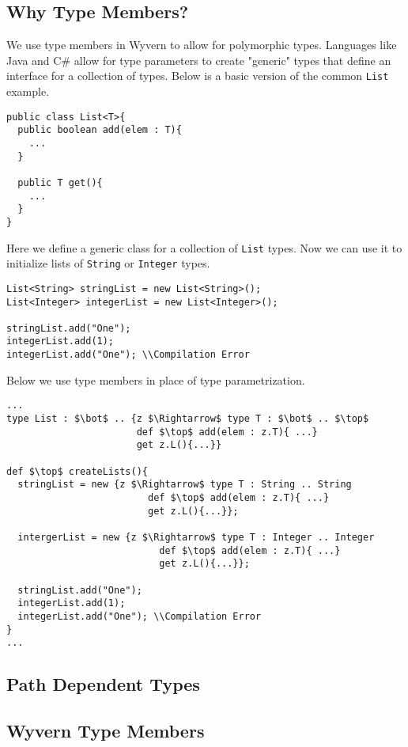 \documentclass{llncs}
\numberwithin{subcase}{casethm}
\numberwithin{casethm}{theorem}
\numberwithin{casethm}{lemma}
\begin{document}
\subsection{Why Type Members?}
We use type members in Wyvern to allow for polymorphic types. 
Languages like Java and C\# allow for type parameters to create 
"generic" types that define an interface for a collection of types. 
Below is a basic version of the common \texttt{List} example.
\begin{lstlisting}[mathescape, style=custom_lang]
public class List<T>{
  public boolean add(elem : T){
    ...
  }

  public T get(){
    ...
  }
}
\end{lstlisting}
Here we define a generic class for a collection of \texttt{List} 
types. Now we can use it to initialize lists of \texttt{String} or 
\texttt{Integer} types.
\begin{lstlisting}[mathescape, style=custom_lang]
List<String> stringList = new List<String>();
List<Integer> integerList = new List<Integer>();

stringList.add("One");
integerList.add(1);
integerList.add("One"); \\Compilation Error
\end{lstlisting}
Below we use type members in place of type parametrization. 
\begin{lstlisting}[mathescape, style=custom_lang]
...
type List : $\bot$ .. {z $\Rightarrow$ type T : $\bot$ .. $\top$
                       def $\top$ add(elem : z.T){ ...}
                       get z.L(){...}}

def $\top$ createLists(){
  stringList = new {z $\Rightarrow$ type T : String .. String
                         def $\top$ add(elem : z.T){ ...}
                         get z.L(){...}};

  intergerList = new {z $\Rightarrow$ type T : Integer .. Integer
                           def $\top$ add(elem : z.T){ ...}
                           get z.L(){...}};

  stringList.add("One");
  integerList.add(1);
  integerList.add("One"); \\Compilation Error
}
...
\end{lstlisting}


\subsection{Path Dependent Types}


\subsection{Wyvern Type Members}
\end{document}
